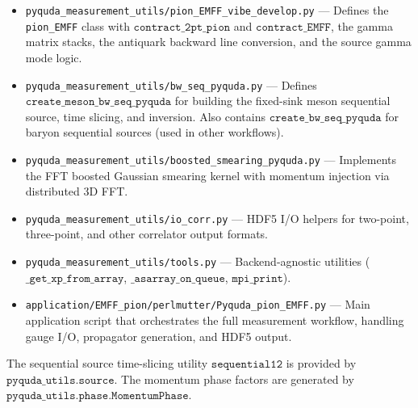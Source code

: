 \documentclass[11pt,a4paper]{article}
\begin{document}
\begin{itemize}[nosep]
  \item \texttt{pyquda\_measurement\_utils/pion\_EMFF\_vibe\_develop.py}
        --- Defines the \texttt{pion\_EMFF} class with
        \(\texttt{contract\_2pt\_pion}\) and \(\texttt{contract\_EMFF}\),
        the gamma matrix stacks, the antiquark backward line conversion, and
        the source gamma mode logic.

  \item \texttt{pyquda\_measurement\_utils/bw\_seq\_pyquda.py}
        --- Defines \(\texttt{create\_meson\_bw\_seq\_pyquda}\) for building
        the fixed-sink meson sequential source, time slicing, and inversion.
        Also contains \(\texttt{create\_bw\_seq\_pyquda}\) for baryon
        sequential sources (used in other workflows).

  \item \texttt{pyquda\_measurement\_utils/boosted\_smearing\_pyquda.py}
        --- Implements the FFT boosted Gaussian smearing kernel with momentum
        injection via distributed 3D FFT.

  \item \texttt{pyquda\_measurement\_utils/io\_corr.py}
        --- HDF5 I/O helpers for two-point, three-point, and other
        correlator output formats.

  \item \texttt{pyquda\_measurement\_utils/tools.py}
        --- Backend-agnostic utilities (\(\texttt{\_get\_xp\_from\_array}\),
        \(\texttt{\_asarray\_on\_queue}\), \(\texttt{mpi\_print}\)).

  \item \texttt{application/EMFF\_pion/perlmutter/Pyquda\_pion\_EMFF.py}
        --- Main application script that orchestrates the full measurement
        workflow, handling gauge I/O, propagator generation, and HDF5 output.
\end{itemize}

The sequential source time-slicing utility \(\texttt{sequential12}\) is provided
by \(\texttt{pyquda\_utils.source}\).  The momentum phase factors are generated
by \(\texttt{pyquda\_utils.phase.MomentumPhase}\).
\end{document}
